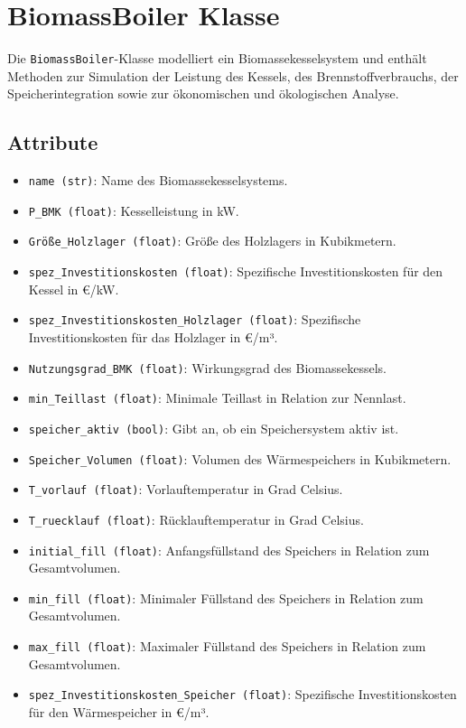\section{BiomassBoiler Klasse}
Die \texttt{BiomassBoiler}-Klasse modelliert ein Biomassekesselsystem und enthält Methoden zur Simulation der Leistung des Kessels, des Brennstoffverbrauchs, der Speicherintegration sowie zur ökonomischen und ökologischen Analyse.

\subsection{Attribute}
\begin{itemize}
    \item \texttt{name (str)}: Name des Biomassekesselsystems.
    \item \texttt{P\_BMK (float)}: Kesselleistung in kW.
    \item \texttt{Größe\_Holzlager (float)}: Größe des Holzlagers in Kubikmetern.
    \item \texttt{spez\_Investitionskosten (float)}: Spezifische Investitionskosten für den Kessel in €/kW.
    \item \texttt{spez\_Investitionskosten\_Holzlager (float)}: Spezifische Investitionskosten für das Holzlager in €/m³.
    \item \texttt{Nutzungsgrad\_BMK (float)}: Wirkungsgrad des Biomassekessels.
    \item \texttt{min\_Teillast (float)}: Minimale Teillast in Relation zur Nennlast.
    \item \texttt{speicher\_aktiv (bool)}: Gibt an, ob ein Speichersystem aktiv ist.
    \item \texttt{Speicher\_Volumen (float)}: Volumen des Wärmespeichers in Kubikmetern.
    \item \texttt{T\_vorlauf (float)}: Vorlauftemperatur in Grad Celsius.
    \item \texttt{T\_ruecklauf (float)}: Rücklauftemperatur in Grad Celsius.
    \item \texttt{initial\_fill (float)}: Anfangsfüllstand des Speichers in Relation zum Gesamtvolumen.
    \item \texttt{min\_fill (float)}: Minimaler Füllstand des Speichers in Relation zum Gesamtvolumen.
    \item \texttt{max\_fill (float)}: Maximaler Füllstand des Speichers in Relation zum Gesamtvolumen.
    \item \texttt{spez\_Investitionskosten\_Speicher (float)}: Spezifische Investitionskosten für den Wärmespeicher in €/m³.

\end{itemize}
